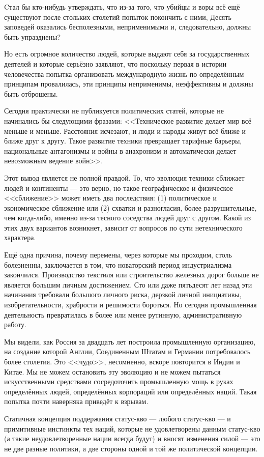 Cтал бы кто-нибудь утверждать, что из-за того, что убийцы и воры всё ещё существуют после стольких столетий попыток покончить с ними, Десять заповедей оказались бесполезными, неприменимыми и, следовательно, должны быть упразднены?

Но есть огромное количество людей, которые выдают себя за государственных деятелей и которые серьёзно заявляют, что поскольку первая в истории человечества попытка организовать международную жизнь по определённым принципам провалилась, эти принципы неприменимы, неэффективны и должны быть отброшены.

Сегодня практически не публикуется политических статей, которые не начинались бы следующими фразами: <<Техническое развитие делает мир всё меньше и меньше. Расстояния исчезают, и люди и народы живут всё ближе и ближе друг к другу. Такое развитие техники превращает тарифные барьеры, национальные антагонизмы и войны в анахронизм и автоматически делает невозможным ведение войн>>.

Этот вывод является не полной правдой. То, что эволюция техники сближает людей и континенты — это верно, но такое географическое и физическое <<сближение>> может иметь два последствия: (1) политическое и экономическое сближение или (2) схватки и разногласия, более разрушительные, чем когда-либо, именно из-за тесного соседства людей друг с другом. Какой из этих двух вариантов возникнет, зависит от вопросов по сути нетехнического характера.

Ещё одна причина, почему перемены, через которые мы проходим, столь болезненны, заключается в том, что новаторский период индустриализма закончился. Производство текстиля или строительство железных дорог больше не является большим личным достижением. Сто или даже пятьдесят лет назад эти начинания требовали большого личного риска, дерзкой личной инициативы, изобретательности, храбрости и решимости бороться. Но сегодня промышленная деятельность превратилась в более или менее рутинную, административную работу.

Мы видели, как Россия за двадцать лет построила промышленную организацию, на создание которой Англии, Соединенным Штатам и Германии потребовалось более столетия. Это <<чудо>>, несомненно, вскоре повторится в Индии и Китае. Мы не можем остановить эту эволюцию и не можем пытаться искусственными средствами сосредоточить промышленную мощь в руках определённых людей, определённых корпораций или определённых наций. Такая попытка почти наверняка приведёт к взрывам.

Статичная концепция поддержания статус-кво — любого статус-кво — и примитивные инстинкты тех наций, которые не удовлетворены данным статус-кво (а такие неудовлетворенные нации всегда будут) и вносят изменения силой — это не две разные политики, а две стороны одной и той же политической концепции.

